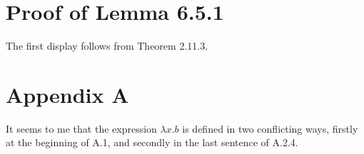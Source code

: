\documentclass[12pt]{article}
\begin{document}

\section{Proof of Lemma 6.5.1}

The first display follows from Theorem 2.11.3.


\section{Appendix A}

It seems to me that the expression $\lambda x.b$ is defined in two conflicting ways, firstly at the beginning of A.1, and secondly in the last sentence of A.2.4. 
\end{document}
